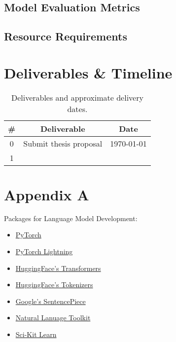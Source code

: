 \documentclass[10pt]{article}
\begin{document}
        \subsection{Model Evaluation Metrics}

        \subsection{Resource Requirements}

    \section{Deliverables \& Timeline}
        \begin{table}[h!]
            \centering
            \begin{tabular}{|c|c|c|}
                \hline
                \# & Deliverable & Date\\
                \hline
                0 & Submit thesis proposal & \today\\
                1 & & \\
                \hline
            \end{tabular}
            \label{table:timeline}
            \caption{Deliverables and approximate delivery dates.}
        \end{table}

    \newpage
    \section{Appendix A}
        Packages for Language Model Development:
        \begin{multicols}{2}
            \begin{itemize}
                \item \href{https://pytorch.org}{PyTorch}
                \item \href{https://www.pytorchlightning.ai}{PyTorch Lightning}
                \item \href{https://github.com/huggingface/transformers}{HuggingFace's Transformers}
                \item \href{https://github.com/huggingface/tokenizers}{HuggingFace's Tokenizers}
                \item \href{https://github.com/google/sentencepiece}{Google's SentencePiece}
                \item \href{https://www.nltk.org}{Natural Lanuage Toolkit}
                \item \href{https://scikit-learn.org}{Sci-Kit Learn}
            \end{itemize}
        \end{multicols}
\end{document}

